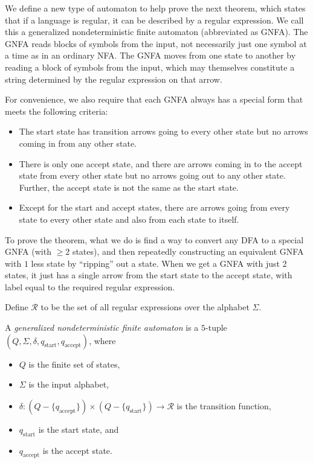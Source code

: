 We define a new type of automaton to help prove the next theorem, which states that if a language is regular, it can be described by a regular expression. We call this a generalized nondeterministic finite automaton (abbreviated as GNFA). The GNFA reads blocks of symbols from the input, not necessarily just one symbol at a time as in an ordinary NFA. The GNFA moves from one state to another by reading a block of symbols from the input, which may themselves constitute a string determined by the regular expression on that arrow.

For convenience, we also require that each GNFA always has a special form that meets the following criteria:
\begin{itemize}
	\item The start state has transition arrows going to every other state but no arrows coming in from any other state.
	\item There is only one accept state, and there are arrows coming in to the accept state from every other state but no arrows going out to any other state. Further, the accept state is not the same as the start state.
	\item Except for the start and accept states, there are arrows going from every state to every other state and also from each state to itself.
\end{itemize}

\label{regRegExpEquivSketch}
To prove the theorem, what we do is find a way to convert any DFA to a special GNFA (with $\geq 2$ states), and then repeatedly constructing an equivalent GNFA with $1$ less state by ``ripping'' out a state. When we get a GNFA with just 2 states, it just has a single arrow from the start state to the accept state, with label equal to the required regular expression.

\vspace{3mm}
Define $\mathcal{R}$ to be the set of all regular expressions over the alphabet $\Sigma$.

\begin{definition}
A \textit{generalized nondeterministic finite automaton} is a $5$-tuple $(Q,\Sigma,\delta,q_{\text{start}},q_{\text{accept}})$, where
\begin{itemize}
	\item $Q$ is the finite set of states,
	\item $\Sigma$ is the input alphabet,
	\item $\delta:(Q-\{q_{\text{accept}}\})\times(Q-\{q_{\text{start}}\})\to\mathcal{R}$ is the transition function,
	\item $q_{\text{start}}$ is the start state, and
	\item $q_{\text{accept}}$ is the accept state.
\end{itemize}
\end{definition}

